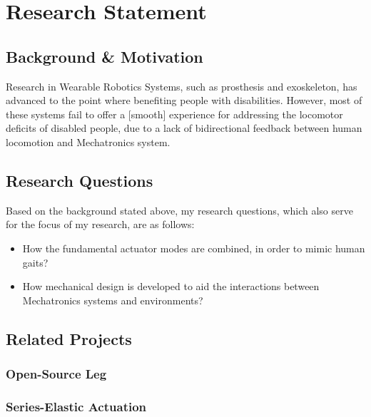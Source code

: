 \documentclass[12pt]{article}
\begin{document}
\tableofcontents

\newpage


\section{Research Statement}

    \subsection{Background \& Motivation}

    Research in Wearable Robotics Systems, such as prosthesis and exoskeleton, has advanced to the point where benefiting people with disabilities. However, most of these systems fail to offer a [smooth] experience for addressing the locomotor deficits of disabled people, due to a lack of bidirectional feedback between human locomotion and Mechatronics system. 

    

    \subsection{Research Questions}
        Based on the background stated above, my research questions, which also serve for the focus of my research, are as follows:
        \begin{itemize}
                
                \item {How the fundamental actuator modes are combined, in order to mimic human gaits?}
                \item {How mechanical design is developed to aid the interactions between Mechatronics systems and environments?}

        \end{itemize}
        

    \subsection{Related Projects}

        \subsubsection{Open-Source Leg}
            
            \subsubsection{Series-Elastic Actuation}
\end{document}
